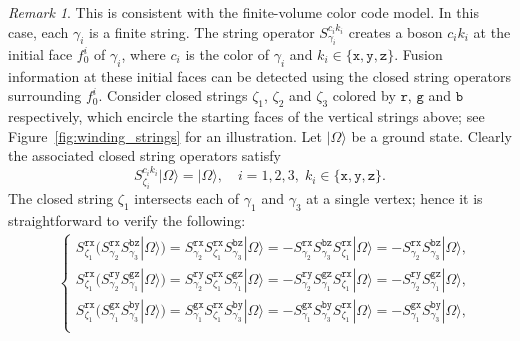 \documentclass[a4paper,11pt]{article}
\theoremstyle{definition}
\theoremstyle{remark}
\newtheorem{remark}{Remark}[section]
\theoremstyle{remark}
\begin{document}
\begin{remark}
This is consistent with the finite-volume color code model. 
In this case, each $\gamma_i$ is a finite string.  
The string operator $S_{\gamma_i}^{c_ik_i}$ creates a boson $c_ik_i$ at the initial face $f_0^i$ of $\gamma_i$, where $c_i$ is the color of $\gamma_i$ and $k_i\in \{\mathtt{x},\mathtt{y},\mathtt{z}\}$. 
Fusion information at these initial faces can be detected using the closed string operators surrounding $f_0^i$.
Consider closed strings $\zeta_1$, $\zeta_2$ and $\zeta_3$ colored by $\mathtt{r}$, $\mathtt{g}$ and $\mathtt{b}$ respectively, which encircle the starting faces of the vertical strings above; see Figure~\ref{fig:winding_strings} for an illustration. 
Let $|\Omega\rangle$ be a ground state.  
Clearly the associated closed string operators satisfy
\begin{equation*}
S_{\zeta_i}^{c_ik_i}|\Omega\rangle = |\Omega\rangle,\quad i=1,2,3,\; k_i\in \{\mathtt{x},\mathtt{y},\mathtt{z}\}.
\end{equation*}
The closed string $\zeta_1$ intersects each of $\gamma_1$ and $\gamma_3$ at a single vertex; hence it is straightforward to verify the following: 
\begin{align*}
    &
    \begin{cases}
        S_{\zeta_1}^{\mathtt{rx}} (S_{\gamma_2}^{\mathtt{rx}}S_{\gamma_3}^{\mathtt{bz}}|\Omega\rangle)  =  S_{\gamma_2}^{\mathtt{rx}} S_{\zeta_1}^{\mathtt{rx}} S_{\gamma_3}^{\mathtt{bz}}|\Omega\rangle = -S_{\gamma_2}^{\mathtt{rx}}S_{\gamma_3}^{\mathtt{bz}} S_{\zeta_1}^{\mathtt{rx}} |\Omega\rangle = -S_{\gamma_2}^{\mathtt{rx}}S_{\gamma_3}^{\mathtt{bz}} |\Omega\rangle, \\
        S_{\zeta_1}^{\mathtt{rx}} (S_{\gamma_2}^{\mathtt{ry}}S_{\gamma_1}^{\mathtt{gz}}|\Omega\rangle)  =  S_{\gamma_2}^{\mathtt{ry}}S_{\zeta_1}^{\mathtt{rx}}S_{\gamma_1}^{\mathtt{gz}}|\Omega\rangle = -S_{\gamma_2}^{\mathtt{ry}}S_{\gamma_1}^{\mathtt{gz}}S_{\zeta_1}^{\mathtt{rx}}|\Omega\rangle = -S_{\gamma_2}^{\mathtt{ry}}S_{\gamma_1}^{\mathtt{gz}}|\Omega\rangle, \\
        S_{\zeta_1}^{\mathtt{rx}} (S_{\gamma_1}^{\mathtt{gx}}S_{\gamma_3}^{\mathtt{by}}|\Omega\rangle)  =   S_{\gamma_1}^{\mathtt{gx}}S_{\zeta_1}^{\mathtt{rx}}S_{\gamma_3}^{\mathtt{by}}|\Omega\rangle = -S_{\gamma_1}^{\mathtt{gx}}S_{\gamma_3}^{\mathtt{by}}S_{\zeta_1}^{\mathtt{rx}}|\Omega\rangle= -S_{\gamma_1}^{\mathtt{gx}}S_{\gamma_3}^{\mathtt{by}}|\Omega\rangle, \\
    \end{cases} \\

\end{align*}
\end{remark}
\end{document}
